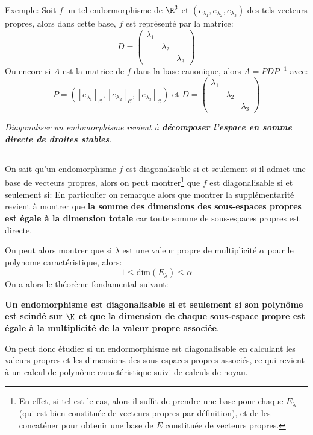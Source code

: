 \underline{Exemple:} Soit \(f\) un tel endormorphisme de \(\R^3\) et \((e_{\lambda_1}, e_{\lambda_2}, e_{\lambda_3})\) des tels vecteurs propres, alors dans cette base, \(f\) est représenté par la matrice:
\[
   D = \left(\begin{array}{ccc}
      \lambda_1 & {} & {}\\
      {} & \lambda_2 & {}\\
      {} & {} & \lambda_3
   \end{array}\right) 
\]
Ou encore si \(A\) est la matrice de \(f\) dans la base canonique, alors \(A = PDP^{-1}\) avec:
\[
   P = ([e_{\lambda_1}]_\mathscr{C}, [e_{\lambda_2}]_\mathscr{C}, [e_{\lambda_3}]_\mathscr{C}) \text{ et } D = \left(\begin{array}{ccc}
      \lambda_1 & {} & {}\\
      {} & \lambda_2 & {}\\
      {} & {} & \lambda_3
   \end{array}\right) 
\]
\begin{center}
   \textit{Diagonaliser un endomorphisme revient à \textbf{décomposer l'espace en somme directe de droites stables}.
   }
\end{center}
\pagebreak

\subsection*{}
On sait qu'un endomorphisme \(f\) est diagonalisable si et seulement si il admet une base de vecteurs propres, alors on peut montrer\footnote[1]{En effet, si tel est le cas, alors il suffit de prendre une base pour chaque \(E_\lambda\) (qui est bien constituée de vecteurs propres par définition), et de les concaténer pour obtenir une base de \(E\) constituée de vecteurs propres.} que \(f\) est diagonalisable si et seulement si:
En particulier on remarque alors que montrer la supplémentarité revient à montrer que \textbf{la somme des dimensions des sous-espaces propres est égale à la dimension totale} car toute somme de sous-espaces propres est directe.\<

On peut alors montrer que si \(\lambda\) est une valeur propre de multiplicité \(\alpha\) pour le polynome caractéristique, alors:
\[
   1 \leq \text{dim}(E_\lambda) \leq \alpha   
\]
On a alors le théorème fondamental suivant:
\begin{center}
   \textbf{Un endomorphisme est diagonalisable si et seulement si son polynôme est scindé sur \(\K\) et que la dimension de chaque sous-espace propre est égale à la multiplicité de la valeur propre associée}.
\end{center}
On peut donc étudier si un endormorphisme est diagonalisable en calculant les valeurs propres et les dimensions des sous-espaces propres associés, ce qui revient à un calcul de polynôme caractéristique suivi de calculs de noyau.

